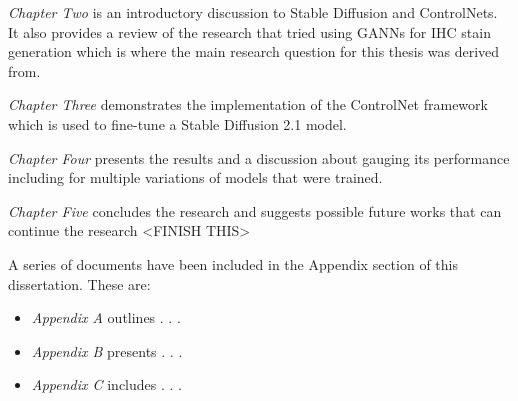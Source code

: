 \emph{Chapter Two} is an introductory discussion to Stable Diffusion and ControlNets. It also provides a review of the research that tried using GANNs for IHC stain generation which is where the main research question for this thesis was derived from. 

\emph{Chapter Three} demonstrates the implementation of the ControlNet framework which is used to fine-tune a Stable Diffusion 2.1 model.

\emph{Chapter Four} presents the results and a discussion about gauging its performance including for multiple variations of models that were trained.

\emph{Chapter Five} concludes the research and suggests possible future works that can continue the research <FINISH THIS>

\vspace{5 mm}

A series of documents have been included in the Appendix section of this dissertation. These are:

\begin{itemize}
\item \emph{Appendix A} outlines . . .

\item \emph{Appendix B} presents . . .

\item \emph{Appendix C} includes . . .
\end{itemize} 

\vspace{5 mm}




